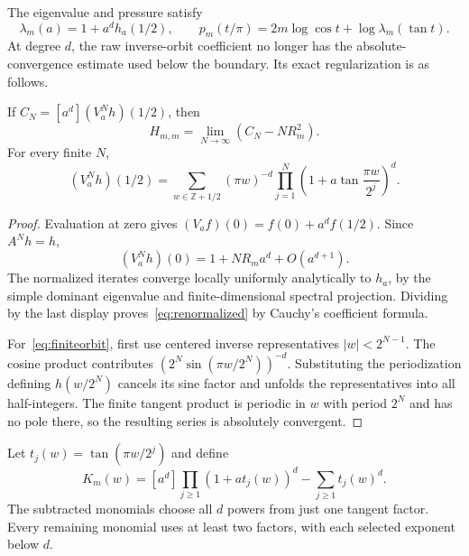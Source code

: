 \documentclass[11pt,a4paper]{article}
\theoremstyle{remark}\newtheorem*{ednote}{Editorial note (ProveIt, 2026-10-01)}
\newcommand{\Z}{\mathbb Z}\newcommand{\ii}{\mathrm i}\newcommand{\ev}{\operatorname{ev}}
\begin{document}
The eigenvalue and pressure satisfy
\begin{equation}\label{eq:feedback}
 \lambda_m(a)=1+a^dh_a(1/2),\qquad
 p_m(t/\pi)=2m\log\cos t+\log\lambda_m(\tan t).
\end{equation}
At degree $d$, the raw inverse-orbit coefficient no longer has the absolute-convergence estimate used below the boundary. Its exact regularization is as follows.

\begin{lemma}\label{lem:regularization}
If $C_N=[a^d](V_a^Nh)(1/2)$, then
\begin{equation}\label{eq:renormalized}
 H_{m,m}=\lim_{N\to\infty}(C_N-NR_m^2).
\end{equation}
For every finite $N$,
\begin{equation}\label{eq:finiteorbit}
 (V_a^Nh)(1/2)=\sum_{w\in\Z+1/2}(\pi w)^{-d}
       \prod_{j=1}^N\left(1+a\tan\frac{\pi w}{2^j}\right)^d.
\end{equation}
\end{lemma}
\begin{proof}
Evaluation at zero gives $(V_af)(0)=f(0)+a^df(1/2)$. Since $A^Nh=h$,
\[
 (V_a^Nh)(0)=1+NR_ma^d+O(a^{d+1}).
\]
The normalized iterates converge locally uniformly analytically to $h_a$, by the simple dominant eigenvalue and finite-dimensional spectral projection. Dividing by the last display proves~\eqref{eq:renormalized} by Cauchy's coefficient formula.

For~\eqref{eq:finiteorbit}, first use centered inverse representatives $|w|<2^{N-1}$. The cosine product contributes $(2^N\sin(\pi w/2^N))^{-d}$. Substituting the periodization defining $h(w/2^N)$ cancels its sine factor and unfolds the representatives into all half-integers. The finite tangent product is periodic in $w$ with period $2^N$ and has no pole there, so the resulting series is absolutely convergent.
\end{proof}

Let $t_j(w)=\tan(\pi w/2^j)$ and define
\[
 K_m(w)=[a^d]\prod_{j\ge1}(1+at_j(w))^d-\sum_{j\ge1}t_j(w)^d.
\]
The subtracted monomials choose all $d$ powers from just one tangent factor. Every remaining monomial uses at least two factors, with each selected exponent below $d$.
\end{document}
